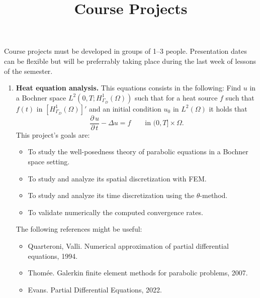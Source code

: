 \documentclass{article}
\title{Course Projects}
\date{}
\newcommand{\parder}[2]{\frac{\partial\,#1}{\partial\,#2}}
\begin{document}
\maketitle
Course projects must be developed in groups of 1--3 people. Presentation dates can be flexible but will be preferrably taking place during the last week of lessons of the semester. 

\begin{enumerate}
    \item \textbf{Heat equation analysis.} This equations consists in the following: Find $u$ in a Bochner space $L^2(0,T;H_{\Gamma_D}^1(\Omega))$ such that for a heat source $f$ such that $f(t)$ in $[H_{\Gamma_D}^1(\Omega)]'$ and an initial condition $u_0$ in $L^2(\Omega)$ it holds that
        $$ \parder{u}{t} - \Delta u = f \qquad\text{in $(0,T]\times \Omega$}. $$
        This project's goals are:
        \begin{itemize}
            \item To study the well-posedness theory of parabolic equations in a Bochner space setting.
            \item To study and analyze its spatial discretization with FEM.
            \item To study and analyze its time discretization using the $\theta$-method.
            \item To validate numerically the computed convergence rates.
        \end{itemize}

        The following references might be useful: 
        \begin{itemize}
            \item Quarteroni, Valli. Numerical approximation of partial differential equations, 1994.
            \item Thomée. Galerkin finite element methods for parabolic problems, 2007.
            \item Evans. Partial Differential Equations, 2022.
        \end{itemize}


\end{enumerate}
\end{document}
